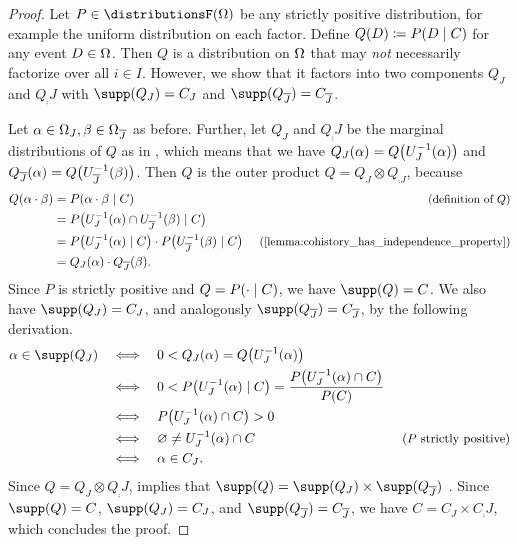 \documentclass[USenglish,onecolumn]{article}
\begin{document}
\begin{proof}
  Let $P \in \distributionsF(\Omg)$ be any strictly positive distribution, for example the uniform distribution on each factor.
  Define $Q(D) \coloneqq P(D \mid C)$ for any event $D \in \Omega$.
  Then $Q$ is a distribution on $\Omega$ that may \emph{not} necessarily factorize over all $i \in I$.
  However, we show that it factors into two components $Q_J$ and $Q_\comp{J}$ with $\supp(Q_J)=C_J$ and $\supp(Q_\comp{J})=C_\comp{J}$.

Let $\alpha\in\Omega_J, \beta\in\Omega_{\overline{J}}$ as before. Further, let $Q_J$ and $Q_\comp{J}$ be the marginal distributions of $Q$ as in , which means that we have $Q_J(\alpha) = Q\big(U_J^{-1}(\alpha)\big)$ and $Q_{\overline{J}}(\alpha) = Q\big(U_{\overline{J}}^{-1}(\beta)\big)$.
  Then $Q$ is the outer product $Q = Q_J \otimes Q_{\comp{J}}$, because 
  \begin{align*}
    Q(\x \cdot \y) &= P(\x \cdot \y \given C) &\text{\small(definition of $Q$)} \\
    &= P\big( U_J^{-1}(\x) \cap U_{\comp{J}}^{-1}(\y) \given C \big) \\
    &
    =P\big( U_J^{-1}(\x) \given C \big) \cdot P\big( U_{\comp{J}}^{-1}(\y) \given C \big) &\text{\small(\Cref{lemma:cohistory_has_independence_property})}\\
    &= Q_J(\x) \cdot Q_{\comp{J}}(\y).
  \end{align*}
%
  Since $P$ is strictly positive and $Q = P(\cdot \mid C)$, we have $\supp(Q) = C$.
We also have $\supp(Q_J) = C_J$, and analogously $\supp(Q_{\comp{J}}) = C_{\comp{J}}$, by the following derivation.
  \begin{align*}
    \x \in \supp(Q_J) \quad &\Longleftrightarrow \quad 0 < Q_J(\x) = Q\big( U_J^{-1}(\x) \big)  \\
    &\Longleftrightarrow \quad 0< P\big( U_J^{-1}(\x) \given C \big) = \frac{P\big( U_J^{-1}(\x) \cap C \big)}{P(C)} \\
    &\Longleftrightarrow \quad P\big( U_J^{-1}(\x) \cap C \big)>0 \\
    & \Longleftrightarrow \quad \nothing \neq U_J^{-1}(\x) \cap C &\text{\small($P$ strictly positive)}\\
    & \Longleftrightarrow \quad \x \in C_J.
  \end{align*}
  Since $Q=Q_J\otimes Q_\comp{J}$,  implies that $\supp(Q) = \supp(Q_J) \times \supp(Q_{\comp{J}})$
  .   Since $\supp(Q)=C$, $\supp(Q_J)=C_J$, and $\supp(Q_\comp{J})=C_\comp{J}$, we have $C=C_J\times C_\comp{J}$, which concludes the proof.
\end{proof}
\end{document}
